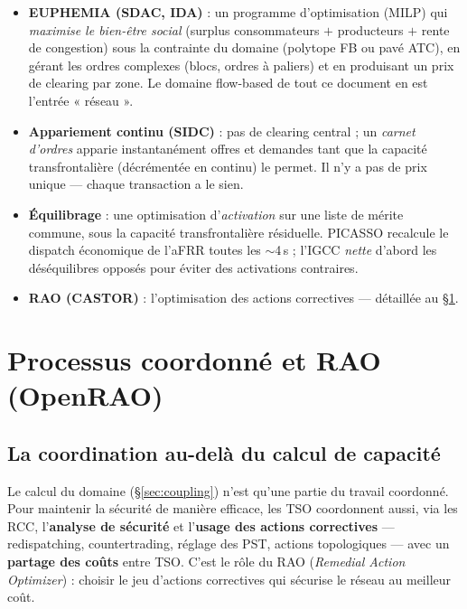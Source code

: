 \documentclass[11pt,a4paper]{article}
\begin{document}
\begin{itemize}[leftmargin=1.4em]
  \item \textbf{EUPHEMIA (SDAC, IDA)} : un programme d'optimisation
        (MILP) qui \emph{maximise le bien-être social} (surplus
        consommateurs $+$ producteurs $+$ rente de congestion) sous la
        contrainte du domaine (polytope FB ou pavé ATC), en gérant les
        ordres complexes (blocs, ordres à paliers) et en produisant un prix
        de clearing par zone. Le domaine flow-based de tout ce document en
        est l'entrée « réseau ».
  \item \textbf{Appariement continu (SIDC)} : pas de clearing central ; un
        \emph{carnet d'ordres} apparie instantanément offres et demandes
        tant que la capacité transfrontalière (décrémentée en continu)
        le permet. Il n'y a pas de prix unique — chaque transaction a le
        sien.
  \item \textbf{Équilibrage} : une optimisation d'\emph{activation} sur une
        liste de mérite commune, sous la capacité transfrontalière
        résiduelle. PICASSO recalcule le dispatch économique de l'aFRR
        toutes les $\sim$4\,s ; l'IGCC \emph{nette} d'abord les déséquilibres
        opposés pour éviter des activations contraires.
  \item \textbf{RAO (CASTOR)} : l'optimisation des actions correctives —
        détaillée au \S\ref{sec:rao}.
\end{itemize}

\section{Processus coordonné et RAO (OpenRAO)}
\label{sec:rao}

\subsection{La coordination au-delà du calcul de capacité}

Le calcul du domaine (\S\ref{sec:coupling}) n'est qu'une partie du travail
coordonné. Pour maintenir la sécurité de manière efficace, les TSO
coordonnent aussi, via les RCC, l'\textbf{analyse de sécurité} et
l'\textbf{usage des actions correctives} — redispatching, countertrading,
réglage des PST, actions topologiques — avec un \textbf{partage des coûts}
entre TSO. C'est le rôle du RAO (\emph{Remedial Action Optimizer}) : choisir
le jeu d'actions correctives qui sécurise le réseau au meilleur coût.
\end{document}
